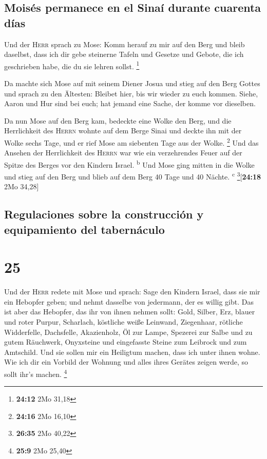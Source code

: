 \hypertarget{moisuxe9s-permanece-en-el-sinauxed-durante-cuarenta-duxedas}{%
\subsection{Moisés permanece en el Sinaí durante cuarenta
días}\label{moisuxe9s-permanece-en-el-sinauxed-durante-cuarenta-duxedas}}

 Und der \textsc{Herr} sprach zu Mose: Komm herauf zu mir
auf den Berg und bleib daselbst, dass ich dir gebe steinerne Tafeln und
Gesetze und Gebote, die ich geschrieben habe, die du sie lehren sollst.
\footnote{\textbf{24:12} 2Mo 31,18}

 Da machte sich Mose auf mit seinem Diener Josua und
stieg auf den Berg Gottes  und sprach zu den Ältesten:
Bleibet hier, bis wir wieder zu euch kommen. Siehe, Aaron und Hur sind
bei euch; hat jemand eine Sache, der komme vor dieselben.

 Da nun Mose auf den Berg kam, bedeckte eine Wolke den
Berg,  und die Herrlichkeit des \textsc{Herrn} wohnte auf
dem Berge Sinai und deckte ihn mit der Wolke sechs Tage, und er rief
Mose am siebenten Tage aus der Wolke. \footnote{\textbf{24:16} 2Mo 16,10}
 Und das Ansehen der Herrlichkeit des \textsc{Herrn} war
wie ein verzehrendes Feuer auf der Spitze des Berges vor den Kindern
Israel. \textsuperscript{b}  Und Mose ging mitten in die
Wolke und stieg auf den Berg und blieb auf dem Berg 40 Tage und 40
Nächte. \textsuperscript{c} \footnote{\textbf{26:35} 2Mo 40,22}{[}\textbf{24:18}
2Mo 34,28{]}

\hypertarget{regulaciones-sobre-la-construcciuxf3n-y-equipamiento-del-tabernuxe1culo}{%
\subsection{Regulaciones sobre la construcción y equipamiento del
tabernáculo}\label{regulaciones-sobre-la-construcciuxf3n-y-equipamiento-del-tabernuxe1culo}}

\hypertarget{section-24}{%
\section{25}\label{section-24}}

 Und der \textsc{Herr} redete mit Mose und sprach:
 Sage den Kindern Israel, dass sie mir ein Hebopfer geben;
und nehmt dasselbe von jedermann, der es willig gibt.  Das
ist aber das Hebopfer, das ihr von ihnen nehmen sollt: Gold, Silber,
Erz,  blauer und roter Purpur, Scharlach, köstliche weiße
Leinwand, Ziegenhaar,  rötliche Widderfelle, Dachsfelle,
Akazienholz,  Öl zur Lampe, Spezerei zur Salbe und zu
gutem Räuchwerk,  Onyxsteine und eingefasste Steine zum
Leibrock und zum Amtschild.  Und sie sollen mir ein
Heiligtum machen, dass ich unter ihnen wohne.  Wie ich dir
ein Vorbild der Wohnung und alles ihres Gerätes zeigen werde, so sollt
ihr's machen. \footnote{\textbf{25:9} 2Mo 25,40}


